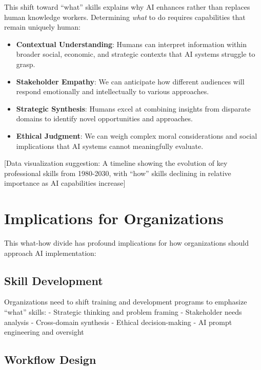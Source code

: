 \documentclass[
  Letterpaper,
]{scrbook}
\providecommand{\tightlist}{%
  \setlength{\itemsep}{0pt}\setlength{\parskip}{0pt}}\usepackage{longtable,booktabs,array}
\begin{document}
This shift toward ``what'' skills explains why AI enhances rather than
replaces human knowledge workers. Determining \emph{what} to do requires
capabilities that remain uniquely human:

\begin{itemize}
\tightlist
\item
  \textbf{Contextual Understanding}: Humans can interpret information
  within broader social, economic, and strategic contexts that AI
  systems struggle to grasp.
\item
  \textbf{Stakeholder Empathy}: We can anticipate how different
  audiences will respond emotionally and intellectually to various
  approaches.
\item
  \textbf{Strategic Synthesis}: Humans excel at combining insights from
  disparate domains to identify novel opportunities and approaches.
\item
  \textbf{Ethical Judgment}: We can weigh complex moral considerations
  and social implications that AI systems cannot meaningfully evaluate.
\end{itemize}

{[}Data visualization suggestion: A timeline showing the evolution of
key professional skills from 1980-2030, with ``how'' skills declining in
relative importance as AI capabilities increase{]}

\section{Implications for
Organizations}\label{implications-for-organizations}

This what-how divide has profound implications for how organizations
should approach AI implementation:

\subsection{Skill Development}\label{skill-development}

Organizations need to shift training and development programs to
emphasize ``what'' skills: - Strategic thinking and problem framing -
Stakeholder needs analysis - Cross-domain synthesis - Ethical
decision-making - AI prompt engineering and oversight

\subsection{Workflow Design}\label{workflow-design}
\end{document}
